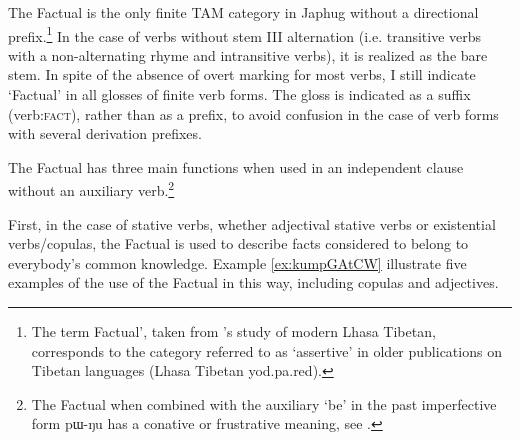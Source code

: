 \documentclass[oldfontcommands,oneside,a4paper,11pt]{article}
\newcommand{\ipa}[1]{{\phon \mbox{#1}}} %
\newcommand{\factual}[1]{\textsc{:fact}}
\begin{document}
The Factual is the only finite TAM category in Japhug without a directional prefix.\footnote{The term Factual', taken from \citet{oisel13aux}'s study of modern Lhasa Tibetan, corresponds to the category referred to as `assertive' in older publications on Tibetan languages (Lhasa Tibetan \ipa{yod.pa.red}).} In the case of verbs without stem III alternation (i.e. transitive verbs with a non-alternating rhyme and intransitive verbs), it is realized as the bare stem. In spite of the absence of overt marking for most verbs, I still indicate `Factual' in all glosses of finite verb forms. The gloss is indicated as a suffix (verb\factual{}), rather than as a prefix, to avoid confusion in the case of verb forms with several derivation prefixes.

The Factual has three main functions when used in an independent clause without an auxiliary verb.\footnote{The Factual when combined with the auxiliary  `be' in the past imperfective form \ipa{pɯ-ŋu} has a conative or frustrative meaning, see \citealt[292]{jacques14linking}.}

First,  in the case of stative verbs, whether adjectival stative verbs or existential verbs/copulas, the Factual is used to describe facts considered to belong to everybody's common knowledge. Example \ref{ex:kumpGAtCW} illustrate five examples of the use of the Factual in this way, including copulas and adjectives. 
\end{document}
